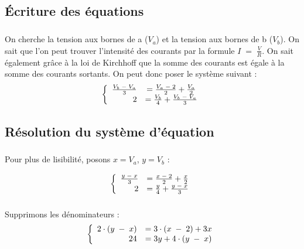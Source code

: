                 
    \subsection{Écriture des équations}
    \subparagraph{}On cherche la tension aux bornes de a ($V_a$) et la tension aux bornes de b ($V_b$). On sait que l'on peut trouver l'intensité des courants par la formule $I\;=\;\frac{V}{R}$. On sait également grâce à la loi de Kirchhoff que la somme des courants est égale à la somme des courants sortants. On peut donc poser le système suivant :
        \begin{equation*}
            \left \{
               \begin{array}{r c l}
                  \frac{V_b\;-\;V_a}{3} & = \frac{V_a\;-\;2}{2} + \frac{V_a}{2} \\
                  2 & = \frac{V_b}{4} + \frac{V_b\;-\;V_a}{3}
               \end{array}
           \right .
        \end{equation*}
        
    \subsection{Résolution du système d'équation}
    
        \subparagraph{}Pour plus de lisibilité, posons $x = V_a$, $y = V_b$ :
            
            \begin{equation*}
            \left \{
               \begin{array}{r c l}
                  \frac{y\;-\;x}{3} & = \frac{x\;-\;2}{2} + \frac{x}{2} \\
                  2 & = \frac{y}{4} + \frac{y\;-\;x}{3}
               \end{array}
           \right .
        \end{equation*}
        
        \subparagraph{}Supprimons les dénominateurs : 
            \begin{equation*}
                \left \{
                   \begin{array}{r c l}
                      2 \cdot (y\;-\;x) & = 3 \cdot (x\;-\;2) + 3x \\
                      24 & = 3y + 4 \cdot (y\;-\;x)
                   \end{array}
               \right .
            \end{equation*}
        
